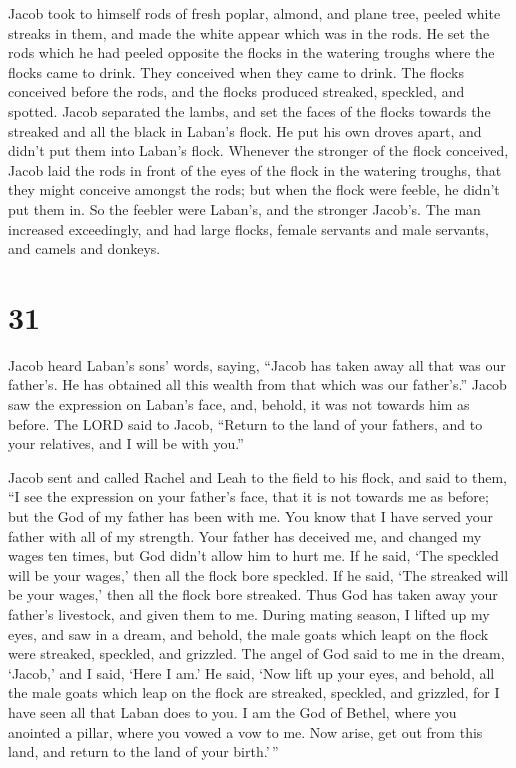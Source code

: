  Jacob took to himself rods of fresh poplar, almond, and
plane tree, peeled white streaks in them, and made the white appear
which was in the rods.  He set the rods which he had
peeled opposite the flocks in the watering troughs where the flocks came
to drink. They conceived when they came to drink.  The
flocks conceived before the rods, and the flocks produced streaked,
speckled, and spotted.  Jacob separated the lambs, and
set the faces of the flocks towards the streaked and all the black in
Laban's flock. He put his own droves apart, and didn't put them into
Laban's flock.  Whenever the stronger of the flock
conceived, Jacob laid the rods in front of the eyes of the flock in the
watering troughs, that they might conceive amongst the rods;
 but when the flock were feeble, he didn't put them in.
So the feebler were Laban's, and the stronger Jacob's. 
The man increased exceedingly, and had large flocks, female servants and
male servants, and camels and donkeys.

\hypertarget{section-30}{%
\section{31}\label{section-30}}

 Jacob heard Laban's sons' words, saying, ``Jacob has
taken away all that was our father's. He has obtained all this wealth
from that which was our father's.''  Jacob saw the
expression on Laban's face, and, behold, it was not towards him as
before.  The LORD said to Jacob, ``Return to the land of
your fathers, and to your relatives, and I will be with you.''

 Jacob sent and called Rachel and Leah to the field to his
flock,  and said to them, ``I see the expression on your
father's face, that it is not towards me as before; but the God of my
father has been with me.  You know that I have served your
father with all of my strength.  Your father has deceived
me, and changed my wages ten times, but God didn't allow him to hurt me.
 If he said, `The speckled will be your wages,' then all
the flock bore speckled. If he said, `The streaked will be your wages,'
then all the flock bore streaked.  Thus God has taken away
your father's livestock, and given them to me.  During
mating season, I lifted up my eyes, and saw in a dream, and behold, the
male goats which leapt on the flock were streaked, speckled, and
grizzled.  The angel of God said to me in the dream,
`Jacob,' and I said, `Here I am.'  He said, `Now lift up
your eyes, and behold, all the male goats which leap on the flock are
streaked, speckled, and grizzled, for I have seen all that Laban does to
you.  I am the God of Bethel, where you anointed a
pillar, where you vowed a vow to me. Now arise, get out from this land,
and return to the land of your birth.'\,''


